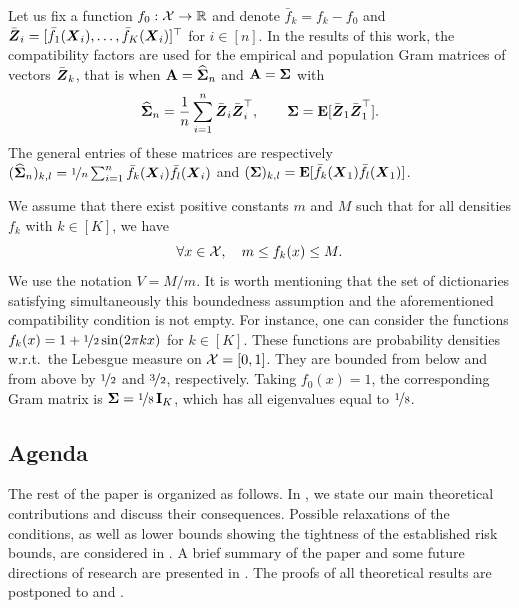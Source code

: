 Let us fix a function $f_0:\mathcal X\to{\mathbb R}$ and denote 
$\bar f_k = f_k-f_0$ and $\bar {\boldsymbol Z}_i = [\bar f_1(\boldsymbol X_i),\ldots,\bar f_K(\boldsymbol X_i)]^\top$ 
for $i\in[n]$. In the results of this work, the compatibility factors are used for the empirical 
and population Gram matrices of vectors $\bar{\boldsymbol Z}_k$, that is when $\mathbf A = \widehat{\boldsymbol\Sigma}_n$ and 
$\mathbf A = \boldsymbol\Sigma$ with
\begin{equation}
\label{Gram}
\widehat{\boldsymbol\Sigma}_n = \frac1n \sum_{i=1}^n \bar{\boldsymbol Z}_i\bar{\boldsymbol Z}_i^\top,\qquad 
\boldsymbol\Sigma = \mathbf E[\bar{\boldsymbol Z}_1\bar{\boldsymbol Z}_1^\top].
\end{equation}
The general entries of these matrices are respectively $(\widehat{\boldsymbol\Sigma}_n)_{k,l} =
\nicefrac1n\sum_{i=1}^n \bar f_k(\boldsymbol X_i)\bar f_l(\boldsymbol X_i)$ and $(\boldsymbol\Sigma)_{k,l} = 
\mathbf E[\bar f_k(\boldsymbol X_1)\bar f_l(\boldsymbol X_1)]$. 

We assume that there exist positive constants $m$ and $M$ such that for all densities 
$f_k$ with $k \in [K]$, we have
\begin{equation}
\label{densConst}
\forall x \in \mathcal X, \quad m\le f_k(x) \le M.
\end{equation}
We use the notation $V = M/m$. It is worth mentioning that the set of dictionaries
satisfying simultaneously this boundedness assumption and the aforementioned compatibility 
condition is not empty. For instance, one can consider the functions 
$f_k(x) = 1+\nicefrac12\sin(2\pi k x)$ for $k\in [K]$. These functions are probability 
densities w.r.t.\ the Lebesgue measure on $\mathcal X = [0,1]$. They are bounded from below 
and from  above by $\nicefrac12$ and $\nicefrac32$, respectively. Taking $f_0(x) = 1$, 
the corresponding Gram matrix is $\boldsymbol\Sigma = \nicefrac18\,\mathbf I_K$, which has all eigenvalues
equal to $\nicefrac18$.

\subsection{Agenda}

The rest of the paper is organized as follows. In , we state our
main theoretical contributions and discuss their consequences. Possible relaxations of
the conditions, as well as lower bounds showing the tightness of the established risk
bounds, are considered in .
A brief summary of the paper and some future directions of research are presented
in . The proofs of all theoretical results are postponed
to  and .

